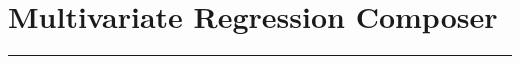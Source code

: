 \documentclass[12pt]{article}
\begin{document}
\section*{Multivariate Regression Composer}
\hrule
\vspace{1cm}
\end{document}
